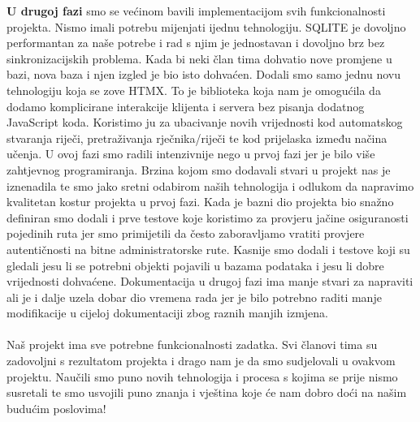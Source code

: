 		
		\textbf{U drugoj fazi} smo se većinom bavili implementacijom svih funkcionalnosti projekta. Nismo imali potrebu mijenjati ijednu tehnologiju. SQLITE je dovoljno performantan za naše potrebe i rad s njim je jednostavan i dovoljno brz bez sinkronizacijskih problema. Kada bi neki član tima dohvatio nove promjene u bazi, nova baza i njen izgled je bio isto dohvaćen. Dodali smo samo jednu novu tehnologiju koja se zove HTMX. To je biblioteka koja nam je omogućila da dodamo komplicirane interakcije klijenta i servera bez pisanja dodatnog JavaScript koda. Koristimo ju za ubacivanje novih vrijednosti kod automatskog stvaranja riječi, pretraživanja rječnika/riječi te kod prijelaska između načina učenja. U ovoj fazi smo radili intenzivnije nego u prvoj fazi jer je bilo više zahtjevnog programiranja. Brzina kojom smo dodavali stvari u projekt nas je iznenadila te smo jako sretni odabirom naših tehnologija i odlukom da napravimo kvalitetan kostur projekta u prvoj fazi. Kada je bazni dio projekta bio snažno definiran smo dodali i prve testove koje koristimo za provjeru jačine osiguranosti pojedinih ruta jer smo primijetili da često zaboravljamo vratiti provjere autentičnosti na bitne administratorske rute. Kasnije smo dodali i testove koji su gledali jesu li se potrebni objekti pojavili u bazama podataka i jesu li dobre vrijednosti dohvaćene. Dokumentacija u drugoj fazi ima manje stvari za napraviti ali je i dalje uzela dobar dio vremena rada jer je bilo potrebno raditi manje modifikacije u cijeloj dokumentaciji zbog raznih manjih izmjena.
		\\
		\\
	   \indent Naš projekt ima sve potrebne funkcionalnosti zadatka. Svi članovi tima su zadovoljni s rezultatom projekta i drago nam je da smo sudjelovali u ovakvom projektu. Naučili smo puno novih tehnologija i procesa s kojima se prije nismo susretali te smo usvojili puno znanja i vještina koje će nam dobro doći na našim budućim poslovima! 
		 \eject 